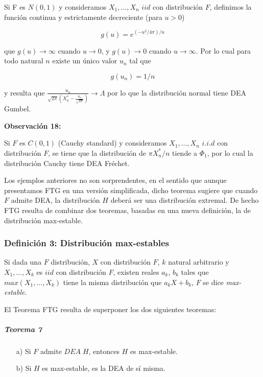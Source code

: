 \documentclass[
  oneside]{article}
\begin{document}
Si F es \(N(0,1)\) y consideramos \(X_1,...,X_n\) \(iid\) con
distribución \(F\), definimos la función continua y estrictamente
decreciente (para \(u>0\))

\[
g(u)=e^{(-u^2/4\pi)/u}
\]

que \(g(u)\rightarrow \infty\) cuando \(u\rightarrow 0\), y
\(g(u)\rightarrow 0\) cuando \(u\rightarrow \infty\). Por lo cual para
todo natural \(n\) existe un único valor \(u_n\) tal que

\[
g(u_n)=1/n
\]

y resulta que
\(\frac{u_n}{\sqrt{2\pi}\left (X_n^*-\frac{u_n}{\sqrt{2\pi}}\right )}\longrightarrow \Lambda\)
por lo que la distribución normal tiene DEA Gumbel.

\textbf{Observación 18:}

Si \(F\) es \(C(0,1)\) (Cauchy standard) y consideramos \(X_1,...,X_n\)
\(i.i.d\) con distribución \(F\), se tiene que la distribución de
\(\pi X^*_n/n\) tiende a \(\Phi_1\), por lo cual la distribución Cauchy
tiene DEA Fréchet.

Los ejemplos anteriores no son sorprendentes, en el sentido que aunque
presentamos FTG en una versión simplificada, dicho teorema sugiere que
cuando \(F\) admite DEA, la distribución \(H\) deberá ser una
distribución extremal. De hecho FTG resulta de combinar dos teoremas,
basadas en una nueva definición, la de distribución max-estable.

\hypertarget{definiciuxf3n-3-distribuciuxf3n-max-estables}{%
\subsubsection{Definición 3: Distribución
max-estables}\label{definiciuxf3n-3-distribuciuxf3n-max-estables}}

Si dada una \(F\) distribución, \(X\) con distribución \(F\), \(k\)
natural arbitrario y \(X_1,...,X_k\) es \(iid\) con distribución \(F\),
existen reales \(a_k\), \(b_k\) tales que \(max(X_1,...,X_k)\) tiene la
misma distribución que \(a_k X+ b_k\), \(F\) se dice
\textit{max-estable}.

El Teorema FTG resulta de superponer los dos siguientes teoremas:

\hypertarget{teorema-7}{%
\subparagraph{Teorema 7}\label{teorema-7}}

\begin{itemize}
  \item[a)] Si $F$ admite $DEA\;H$, entonces $H$ es max-estable.
  \item[b)] Si $H$ es max-estable, es la DEA de sí misma.
\end{itemize}
\end{document}
